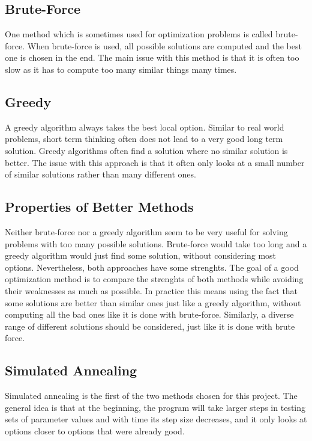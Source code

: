 \documentclass[10pt]{report}
\begin{document}
\subsection{Brute-Force}
One method which is sometimes used for optimization problems is called brute-force. When brute-force is used, all possible solutions are computed and the best one is chosen in the end. The main issue with this method is that it is often too slow as it has to compute too many similar things many times.

\subsection{Greedy}
A greedy algorithm always takes the best local option. Similar to real world problems, short term thinking often does not lead to a very good long term solution. Greedy algorithms often find a solution where no similar solution is better. The issue with this approach is that it often only looks at a small number of similar solutions rather than many different ones.

\subsection{Properties of Better Methods}
Neither brute-force nor a greedy algorithm seem to be very useful for solving problems with too many possible solutions. Brute-force would take too long and a greedy algorithm would just find some solution, without considering most options. Nevertheless, both approaches have some strenghts. The goal of a good optimization method is to compare the strenghts of both methods while avoiding their weaknesses as much as possible. In practice this means using the fact that some solutions are better than similar ones just like a greedy algorithm, without computing all the bad ones like it is done with brute-force. Similarly, a diverse range of different solutions should be considered, just like it is done with brute force.

\subsection{Simulated Annealing}
Simulated annealing is the first of the two methods chosen for this project. The general idea is that at the beginning, the program will take larger steps in testing sets of parameter values and with time its step size decreases, and it only looks at options closer to options that were already good. \cite{SA1} %
\end{document}
